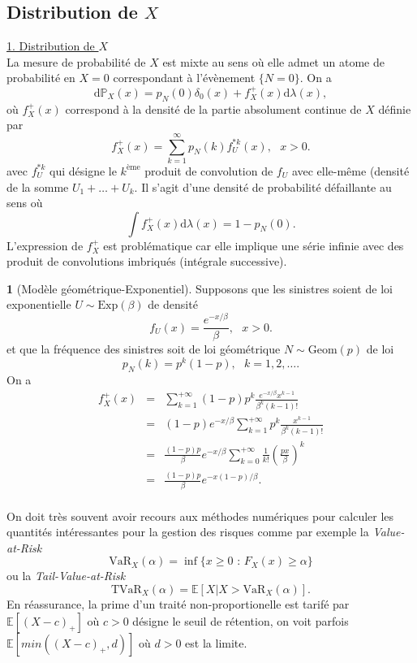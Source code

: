 \documentclass[8pt,notheorems]{beamer}
\def \E{\mathbb E}
\def \P {\mathbb P}
\theoremstyle{definition}
\theoremstyle{example}
\newtheorem{example}{\translate{Example}}
\theoremstyle{mystyle}
\theoremstyle{plain}
\begin{document}
\subsection{Distribution de $X$}
\begin{frame}[allowframebreaks]
\underline{1. Distribution de $X$}\\
La mesure de probabilité de $X$ est mixte au sens où elle admet un atome de probabilité en $X=0$ correspondant à l'évènement $\{N = 0\}$. On a
$$
\text{d}\P_X(x) = p_N(0)\delta_0(x)+f_X^{+}(x)\text{d}\lambda(x),
$$
où $f_X^{+}(x)$ correspond à la densité de la partie absolument continue de $X$ définie par
$$
f^{+}_X(x) = \sum_{k = 1}^{\infty}p_N(k)f_U^{\ast k}(x),\text{ }x>0.
$$
avec $f_U^{\ast k}$ qui désigne le $k^{\text{ème}}$ produit de convolution de $f_U$ avec elle-même (densité de la somme $U_1+\ldots+ U_k$. Il s'agit d'une densité de probabilité défaillante au sens où
$$
\int f^{+}_X(x)\text{d}\lambda(x) = 1-p_N(0).
$$
L'expression de $f_X^+$ est problématique car elle implique une série infinie avec des produit de convolutions imbriqués (intégrale successive).
\begin{example}[Modèle géométrique-Exponentiel]
Supposons que les sinistres soient de loi exponentielle $U\sim \text{Exp}(\beta)$ de densité
$$
f_U(x) = \frac{e^{-x/\beta}}{\beta},\text{ }x>0.
$$
et que la fréquence des sinistres soit de loi géométrique $N\sim \text{Geom}(p)$ de loi
$$
p_N(k) = p^k(1-p),\text{ }k = 1,2,\ldots.
$$
On a
\begin{eqnarray*}
f_X^+(x) &=& \sum_{k = 1}^{+\infty}(1-p)p^k\frac{e^{-x/\beta}x^{k-1}}{\beta^k (k-1)!}\\
&=& (1-p)e^{-x/\beta}\sum_{k = 1}^{+\infty}p^k\frac{x^{k-1}}{\beta^k(k-1)!}\\
&=&\frac{(1-p)p}{\beta}e^{-x/\beta}\sum_{k = 0}^{+\infty}\frac{1}{k!}\left(\frac{px}{\beta}\right)^k\\
&=&\frac{(1-p)p}{\beta}e^{-x(1-p)/\beta}.\\
\end{eqnarray*}
\end{example}
\end{frame}
\begin{frame}
On doit très souvent avoir recours aux méthodes numériques pour calculer les quantités intéressantes pour la gestion des risques comme par exemple la \textit{Value-at-Risk}
$$
\text{VaR}_X(\alpha) = \inf\{x\geq0\text{ : }F_{X}(x)\geq\alpha\}
$$
ou la \textit{Tail-Value-at-Risk}
$$
\text{TVaR}_X(\alpha) = \E[X|X>\text{VaR}_X(\alpha)].
$$
En réassurance, la prime d'un traité non-proportionelle est tarifé par
$\E[(X-c)_+]$ où $c>0$ désigne le seuil de rétention, on voit parfois $\E[min((X-c)_+, d)]$ où $d>0$ est la limite.
 \end{frame}
\end{document}
